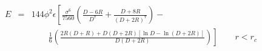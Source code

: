 


\begin{eqnarray}
E &=& 144 \phi^2 \epsilon \left[ \frac{\sigma^{6}}{7560} 
  \left(\frac{D-6R}{D^{7}} + \frac{D+8R}{(D+2R)^{7}} \right) - 
  \frac{}{} \right. \nonumber \\
  &&\qquad \left. \frac{1}{6} \left(\frac{2R(D+R) + D(D+2R)
    \left[ \ln D - \ln (D+2R) \right]}{D(D+2R)} \right) \right] 
\qquad r < r_c \nonumber
\end{eqnarray}


